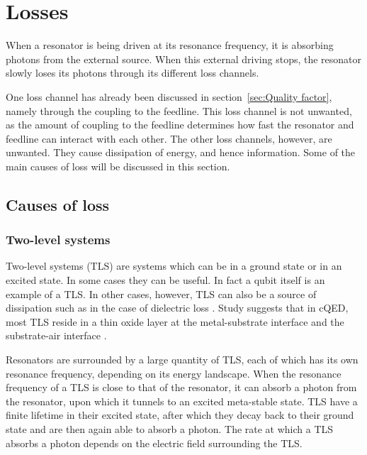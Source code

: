   \section{Losses}
    \label{sec:Losses}

      When a resonator is being driven at its resonance frequency, it is absorbing photons from the external source. When this external driving stops, the resonator slowly loses its photons through its different loss channels.

      One loss channel has already been discussed in section~\ref{sec:Quality factor}, namely through the coupling to the feedline. This loss channel is not unwanted, as the amount of coupling to the feedline determines how fast the resonator and feedline can interact with each other. The other loss channels, however, are unwanted. They cause dissipation of energy, and hence information. Some of the main causes of loss will be discussed in this section.


  \subsection{Causes of loss}

    \subsubsection{Two-level systems}
      \label{sec:TLS}

      Two-level systems (TLS) are systems which can be in a ground state or in an excited state. In some cases they can be useful. In fact a qubit itself is an example of a TLS. In other cases, however, TLS can also be a source of dissipation such as in the case of dielectric loss \cite{martinis2014ucsb}. Study suggests that in cQED, most TLS reside in a thin oxide layer at the metal-substrate interface and the substrate-air interface \cite{wenner2011surface}.

      Resonators are surrounded by a large quantity of TLS, each of which has its own resonance frequency, depending on its energy landscape. When the resonance frequency of a TLS is close to that of the resonator, it can absorb a photon from the resonator, upon which it tunnels to an excited meta-stable state. TLS have a finite lifetime in their excited state, after which they decay back to their ground state and are then again able to absorb a photon. The rate at which a TLS absorbs a photon depends on the electric field surrounding the TLS.

